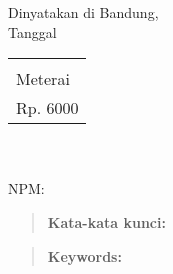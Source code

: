 \documentclass[11pt,a4paper,twoside,openright,notitlepage]{report}
\begin{document}
{{{				\begin{flushright}	
					Dinyatakan di Bandung,\\
					Tanggal \vtanggal\ \vbulan\ \vtahun \\ \vspace{0.5cm}
					\begin{tabular}{|p{1.75cm}|}
						\hline\\ Meterai \\ Rp. 6000 \\  \hline
					\end{tabular}\\
					\vspace{0.5cm}   
					\vnama \\
					NPM: \vnpm
				\end{flushright}
				\cleardoublepage 
				
			}{} %
			
			\renewcommand{\abstractname}{Abstrak} 
			\vspace*{4cm} 
			\begin{abstract} 
				{\noindent \vabstrakINA} \vskip 1cm
				{\noindent \textbf{Kata-kata kunci:} \vkunciINA}
			\end{abstract}
			\cleardoublepage 
			\renewcommand{\abstractname}{Abstract}
			\vspace*{4cm}
			\begin{abstract}
				{\noindent \vabstrakENG} \vskip 1cm		
				{\noindent \textbf{Keywords:} \vkunciENG} 
			\end{abstract}			
			\cleardoublepage
			
			
		}{} %
		
		\tableofcontents \cleardoublepage 							%
	}{} %
	
\end{document}
